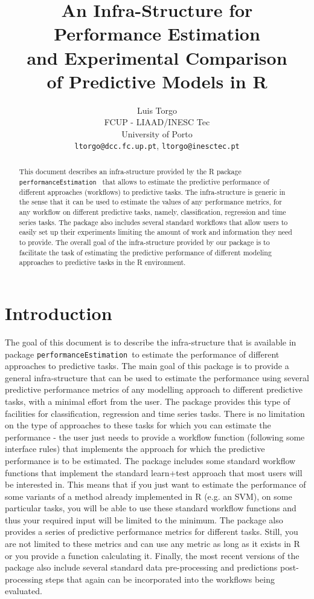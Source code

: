 \documentclass[10pt,a4paper]{article}\usepackage[]{graphicx}\usepackage[]{color}
\author{Luis Torgo\\FCUP - LIAAD/INESC Tec\\University of Porto\\
  \texttt{ltorgo@dcc.fc.up.pt}, \texttt{ltorgo@inesctec.pt}}
\title{An Infra-Structure for Performance Estimation\\ and Experimental Comparison\\ of Predictive Models in R}
\newcommand{\PE}{package \texttt{performanceEstimation}\ }
\begin{document}
\maketitle

\begin{abstract}
  
  This document describes an infra-structure provided by the R \PE
  that allows to estimate the predictive performance of different
  approaches (workflows) to predictive tasks.  The infra-structure is
  generic in the sense that it can be used to estimate the values of
  any performance metrics, for any workflow on different predictive
  tasks, namely, classification, regression and time series tasks. The
  package also includes several standard workflows that allow users to
  easily set up their experiments limiting the amount of work and
  information they need to provide. The overall goal of the
  infra-structure provided by our package is to facilitate the task of
  estimating the predictive performance of different modeling
  approaches to predictive tasks in the R environment.
   
\end{abstract}

\section{Introduction}

The goal of this document is to describe the infra-structure that is
available in \PE to estimate the performance of different approaches
to predictive tasks.  The main goal of this package is to provide a
general infra-structure that can be used to estimate the performance
using several predictive performance metrics of any modelling approach
to different predictive tasks, with a minimal effort from the
user. The package provides this type of facilities for classification,
regression and time series tasks. There is no limitation on the type
of approaches to these tasks for which you can estimate the
performance - the user just needs to provide a workflow function
(following some interface rules) that implements the approach for
which the predictive performance is to be estimated. The package
includes some standard workflow functions that implement the standard
learn+test approach that most users will be interested
in. This means that if you just want to estimate the performance of
some variants of a method already implemented in R (e.g. an SVM), on
some particular tasks, you will be able to use these standard workflow
functions and thus your required input will be limited to the minimum. The
package also provides a series of predictive performance metrics for
different tasks. Still, you are not limited to these metrics and can
use any metric as long as it exists in R or you provide a function
calculating it. Finally, the most recent versions of the package also
include several standard data pre-processing and predictions
post-processing steps that again can be incorporated into the
workflows being evaluated.  
\end{document}
